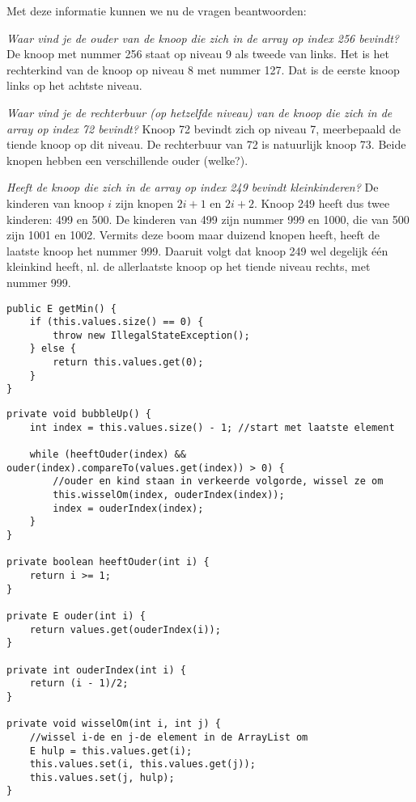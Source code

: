 \begin{Oplossing}{5.2}
Met deze informatie kunnen we nu de vragen beantwoorden:
\begin{oefenumerate}
	\item \emph{Waar vind je de ouder van de knoop die zich in de array op index 256 bevindt?} De knoop met nummer 256 staat op niveau 9 als tweede van links. Het is het rechterkind van de knoop op niveau 8 met nummer 127. Dat is de eerste knoop links op het achtste niveau.
	\item \emph{Waar vind je de rechterbuur (op hetzelfde niveau) van de knoop die zich in de array op index 72 bevindt?} Knoop 72 bevindt zich op niveau 7, meerbepaald de tiende knoop op dit niveau. De rechterbuur van 72 is natuurlijk knoop 73. Beide knopen hebben een verschillende ouder (welke?).
	\item \emph{Heeft de knoop die zich in de array op index 249 bevindt kleinkinderen?} De kinderen van knoop $i$ zijn knopen $2i+1$ en $2i+2$. Knoop 249 heeft dus twee kinderen: 499 en 500. De kinderen van 499 zijn nummer 999 en 1000, die van 500 zijn 1001 en 1002. Vermits deze boom maar duizend knopen heeft, heeft de laatste knoop het nummer 999. Daaruit volgt dat knoop 249 wel degelijk één kleinkind heeft, nl. de allerlaatste knoop op het tiende niveau rechts, met nummer 999.
\end{oefenumerate}
\end{Oplossing}
\begin{Oplossing}{5.3}
\begin{lstlisting}[caption={kleinste waarde van min-heap}, label=minheapkleinste]
public E getMin() {
	if (this.values.size() == 0) {
		throw new IllegalStateException();
	} else {
		return this.values.get(0);
	}
}
\end{lstlisting}

\end{Oplossing}
\begin{Oplossing}{5.4}
\begin{lstlisting}[caption={bubbleUp methode}, label=minheapbubbleUp]
private void bubbleUp() {
	int index = this.values.size() - 1; //start met laatste element
		
	while (heeftOuder(index) && ouder(index).compareTo(values.get(index)) > 0) {
		//ouder en kind staan in verkeerde volgorde, wissel ze om
		this.wisselOm(index, ouderIndex(index));
		index = ouderIndex(index);
	}
}

private boolean heeftOuder(int i) {
	return i >= 1;
}

private E ouder(int i) {
	return values.get(ouderIndex(i));
}

private int ouderIndex(int i) {
	return (i - 1)/2;
}
	
private void wisselOm(int i, int j) {
	//wissel i-de en j-de element in de ArrayList om
	E hulp = this.values.get(i);
	this.values.set(i, this.values.get(j));
	this.values.set(j, hulp);
}
\end{lstlisting}
\end{Oplossing}
